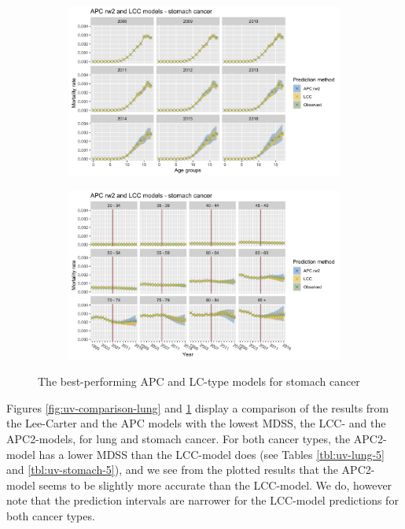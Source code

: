 \begin{figure}[h!]
    \centering
    \begin{subfigure}[b]{.6\linewidth}
        \includegraphics[width=\linewidth]{real-data/real-data-univariate/Figures/univariate-comparison-by-age-stomach.png}
    \end{subfigure}
    
    \begin{subfigure}[b]{.6\linewidth}
        \includegraphics[width=\linewidth]{real-data/real-data-univariate/Figures/univariate-comparison-by-period-stomach.png}
    \end{subfigure}
    \caption{The best-performing APC and LC-type models for stomach cancer}
    \label{fig:uv-comparison-stomach}
\end{figure}

Figures \ref{fig:uv-comparison-lung} and \ref{fig:uv-comparison-stomach} display a comparison of the results from the Lee-Carter and the APC models with the lowest MDSS, the LCC- and the APC2-models, for lung and stomach cancer. For both cancer types, the APC2-model has a lower MDSS than the LCC-model does (see Tables \ref{tbl:uv-lung-5} and \ref{tbl:uv-stomach-5}), and we see from the plotted results that the APC2-model seems to be slightly more accurate than the LCC-model. We do, however note that the prediction intervals are narrower for the LCC-model predictions for both cancer types.

